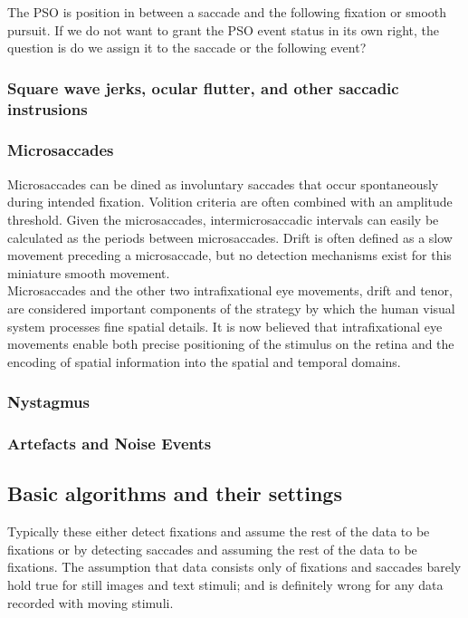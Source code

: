 \documentclass[12pt]{article}
\theoremstyle{definition}
\begin{document}
The PSO is position in between a saccade and the following fixation or smooth pursuit. If we do not want to grant the PSO event status in its own right, the question is do we assign it to the saccade or the following event?

\subsubsection{Square wave jerks, ocular flutter, and other saccadic instrusions}

\subsubsection{Microsaccades} 
Microsaccades can be dined as involuntary saccades that occur spontaneously during intended fixation. Volition criteria are often combined with an amplitude threshold. Given the microsaccades, intermicrosaccadic intervals can easily be calculated as the periods between microsaccades. Drift is often defined as a slow movement preceding a microsaccade, but no detection mechanisms exist for this miniature smooth movement.\\

Microsaccades and the other two intrafixational eye movements, drift and tenor, are considered important components of the strategy by which the human visual system processes fine spatial details. It is now believed that intrafixational eye movements enable both precise positioning of the stimulus on the retina and the encoding of spatial information into the spatial and temporal domains. 

\subsubsection{Nystagmus}

\subsubsection{Artefacts and Noise Events}



\subsection{Basic algorithms and their settings}
Typically these either detect fixations and assume the rest of the data to be fixations or by detecting saccades and assuming the rest of the data to be fixations. The assumption that data consists only of fixations and saccades barely hold true for still images and text stimuli; and is definitely wrong for any data recorded with moving stimuli.
\end{document}
